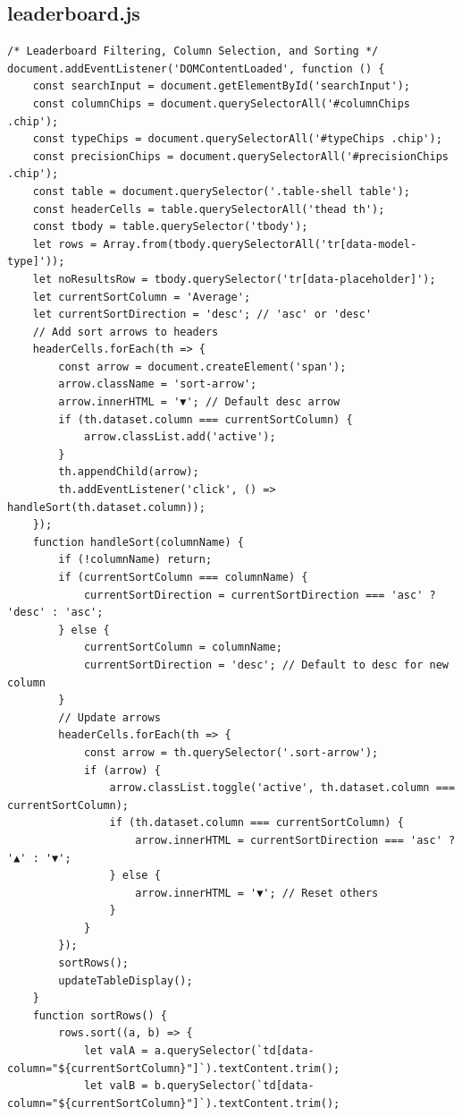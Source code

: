 \documentclass[12pt, a4paper, onecolumn]{report}
\begin{document}
\subsection*{leaderboard.js}
\begin{lstlisting}[language=JS]
/* Leaderboard Filtering, Column Selection, and Sorting */
document.addEventListener('DOMContentLoaded', function () {
    const searchInput = document.getElementById('searchInput');
    const columnChips = document.querySelectorAll('#columnChips .chip');
    const typeChips = document.querySelectorAll('#typeChips .chip');
    const precisionChips = document.querySelectorAll('#precisionChips .chip');
    const table = document.querySelector('.table-shell table');
    const headerCells = table.querySelectorAll('thead th');
    const tbody = table.querySelector('tbody');
    let rows = Array.from(tbody.querySelectorAll('tr[data-model-type]'));
    let noResultsRow = tbody.querySelector('tr[data-placeholder]');
    let currentSortColumn = 'Average';
    let currentSortDirection = 'desc'; // 'asc' or 'desc'
    // Add sort arrows to headers
    headerCells.forEach(th => {
        const arrow = document.createElement('span');
        arrow.className = 'sort-arrow';
        arrow.innerHTML = '▼'; // Default desc arrow
        if (th.dataset.column === currentSortColumn) {
            arrow.classList.add('active');
        }
        th.appendChild(arrow);
        th.addEventListener('click', () => handleSort(th.dataset.column));
    });
    function handleSort(columnName) {
        if (!columnName) return;
        if (currentSortColumn === columnName) {
            currentSortDirection = currentSortDirection === 'asc' ? 'desc' : 'asc';
        } else {
            currentSortColumn = columnName;
            currentSortDirection = 'desc'; // Default to desc for new column
        }
        // Update arrows
        headerCells.forEach(th => {
            const arrow = th.querySelector('.sort-arrow');
            if (arrow) {
                arrow.classList.toggle('active', th.dataset.column === currentSortColumn);
                if (th.dataset.column === currentSortColumn) {
                    arrow.innerHTML = currentSortDirection === 'asc' ? '▲' : '▼';
                } else {
                    arrow.innerHTML = '▼'; // Reset others
                }
            }
        });
        sortRows();
        updateTableDisplay();
    }
    function sortRows() {
        rows.sort((a, b) => {
            let valA = a.querySelector(`td[data-column="${currentSortColumn}"]`).textContent.trim();
            let valB = b.querySelector(`td[data-column="${currentSortColumn}"]`).textContent.trim();

\end{lstlisting}
\end{document}
